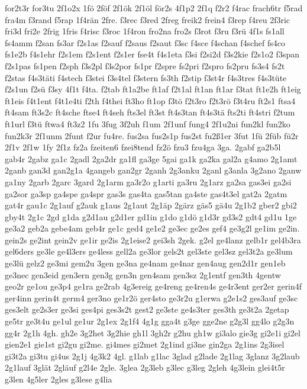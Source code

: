 {for2t3r
for3tu
2f1o2x
1fö
2föf
2f1ök
2f1öl
för2s
4f1p2
2f1q
f2r2
f4rac
frach6tr
f5rad
fra4m
f3rand
f5rap
1f4rän
2fre.
f3rec
f3red
2freg
freik2
frein4
f3rep
f4reu
2f3ric
fri3d
fri2e
2frig
1fris
f4risc
f3roc
1f4ron
fro2na
fro2s
f3rot
f3ru
f3rü
4f1s
fs1all
fs4amm
f2san
fs3ar
f2s1as
f2sauf
f2saus
f2saut
f3sc
f4sce
f4schan
f4schef
fs4co
fs1e2b
f4s1ehr
f2s1em
f2s1ent
f2s1er
fse4t
f4s1eta
f3si
f2si2d
f3s2kie
f2s1o2
f3span
f2s1pas
fs1pen
f2sph
f3s2pl
f3s2por
fs1pr
f2spre
fs2pri
f2spro
fs2pru
fs3s4
fs2t
f2stas
f4s3täti
f4stech
f3stei
f3s4tel
f3stern
fs3th
f2stip
f3st4r
f4s3tres
f4s3tüte
f2s1un
f2sü
f3sy
4f1t
f4ta.
f2tab
ft1a2be
ft1af
f2t1al
ft1an
ft1ar
f3tat
ft1e2h
ft1eig
ft1eis
f4t1ent
f4t1e4ti
f2th
f4thei
ft3ho
ft1op
f3tö
f2t3ro
f2t3rö
f3t4ru
ft2s1
ftsa4
ft4sam
ft3s2c
ft4sche
ftse4
ft4seh
fts3el
ft3st
ft4s3tan
ft4s3tä
fts2ti
ft4stri
f2tum
ft1url
f3tü
ftwa4
ft3z2
1fu
3fug
3f2uh
f1um
2f1unf
fung4
2f1u2ni
fun2kl
fun2ko
fun2k3r
2f1unm
2funt
f2ur
fu4re.
fus2sa
fus2s1p
fus2st
fu2ß1er
3fut
1fü
2füb
fü2r
2f1v
2f1w
1fy
2f1z
fz2a
fzeiten6
fzei8tend
fz2ö
fzu3
fzu4ga
3ga.
2gabf
ga2b5l
gab4r
2gabz
ga1c
2gadl
2ga2dr
ga1fl
ga3ge
5gai
ga1k
ga2ka
gal2a
g4amo
2g1amt
2ganb
gan3d
gan2g1a
4gangeb
gan2gr
2ganh
2g3anku
2ganl
g3anla
3g2ano
2ganw
ga1ny
2garb
2garc
3gard
2g1arm
ga3r2o
g1arti
ga3ru
2g1arz
ga2sa
gas3ei
ga2si
ga2sor
ga3sp
ga4spe
ga4spr
gas3s
gas4ta
gas5tan
ga4ste
gas4t3el
gat2a
2gatm
gat4r
gau1c
2g1auf
g2auk
g1aus
2g1aut
2g1äp
2gärz
gäs5
gä4u
2g1b2
gber2
gbi2
gby4t
2g1c
2gd
g1da
g2d1au
g2d1er
gd1in
g1do
g1dö
g1d3r
gd3s2
gdt4
gd1u
1ge
ge3a2
geb2a
gebe4am
geb4r
ge1c
ged4
ge1e2
ge3ec
ge2es
gef4
ge3g2l
ge1im
ge2in.
gein2s
ge2int
gein2v
ge1ir
ge2is
2g1eise2
gei3sh
2gek.
g2el
ge4lanz
gelb1r
gel4b3ra
gel6ders
ge3le
ge4l3ers
ge4less
gell2a
ge3lor
gels2t
gel3ste
gel3sz
gel3t2a
ge3lum
ge3lü
gelz2
ge3mi
gem2u
3gen
ge3na
ge4nam
ge4nar
gen4aug
gen2d1r
gen1eb
ge3nec
gen3eid
gen3ern
gen3g
gen3n
gen4sam
gen3sz
2g1entf
gen3th
4gentw
geo2r
ge1ou
ge3p4
ge1ra
ge2rab
4g3ereig
ge4reng
ge4ren4s
ge4r3ent
ger2er
gerin4f
ger4inn
gerin4t
germ4
ger3no
ge1r2ö
ger4sto
ge3r2u
g1erwa
g2e1s2
ges3auf
ge3sc
ges3elt
ge2s3er
ge3si
ges4pi
ges3s2t
gest2
ge3ste
ge4s3ter
ges3th
ge3t2a
2getap
ge5tr
ge3t4u
ge1ul
ge1ur
2g1ex
2g1f4
4g1g
gga4t
g3ge
gge2ne
g2g3l
gg4lo
g2g3n
gg4r
2g1h
4gh.
gh2e
3g2het
3g2hie
gh1l
3gh2r
g2hu
gh1w
gi3alo
gie3g
gi2e1i
gi2el
gien2e1
gie1st
gi2gu
gi2me.
gi4mes
gi2met
2g1ind
gi3ne
gin2ga
2g1ins
2g3isel
gi3t2a
gi3tu
gi4us
2g1j
4g3k2
4gl.
g1lab
g1lac
3glad
g2lade
2g1lag
3glanz
3g2laub
2g1lauf
3glät
2gläuf
g2l4e
2gle.
3glea
2g3leb
g3lec
g3leg
2gleh
4g3lein
glei4t5r
g3len
4g5ler
2gles
g3lese
g4lia
}
